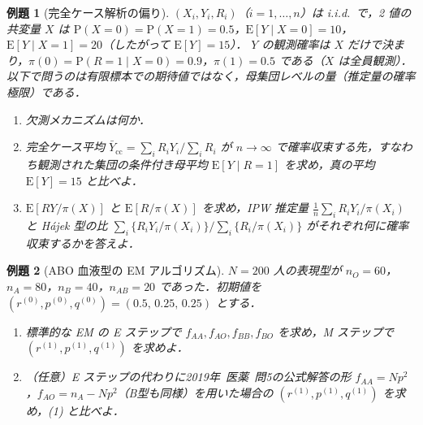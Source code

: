 \documentclass[a4paper,11pt,openany]{ltjsbook}
\newtheorem{reidai}{例題}[chapter]
\newcommand{\kakomon}[2]{\mbox{#1年 医薬 問#2}}
\newcommand{\E}{\mathrm{E}}
\newcommand{\Prob}{\mathrm{P}}
\begin{document}
\begin{reidai}[完全ケース解析の偏り]\label{reidai:16-2}
$(X_i,Y_i,R_i)$（$i=1,\dots,n$）は i.i.d.\ で，2 値の共変量 $X$ は $\Prob(X=0)=\Prob(X=1)=0.5$，$\E[Y\mid X=0]=10$，$\E[Y\mid X=1]=20$（したがって $\E[Y]=15$）．
$Y$ の観測確率は $X$ だけで決まり，$\pi(0)=\Prob(R=1\mid X=0)=0.9$，$\pi(1)=0.5$ である（$X$ は全員観測）．
以下で問うのは有限標本での期待値ではなく，母集団レベルの量（推定量の確率極限）である．
\begin{enumerate}[label=(\arabic*)]
\item 欠測メカニズムは何か．
\item 完全ケース平均 $\bar Y_{\mathrm{cc}}=\sum_iR_iY_i/\sum_iR_i$ が $n\to\infty$ で確率収束する先，すなわち観測された集団の条件付き母平均 $\E[Y\mid R=1]$ を求め，真の平均 $\E[Y]=15$ と比べよ．
\item $\E[RY/\pi(X)]$ と $\E[R/\pi(X)]$ を求め，IPW 推定量 $\frac1n\sum_iR_iY_i/\pi(X_i)$ と Hájek 型の比 $\sum_i\{R_iY_i/\pi(X_i)\}/\sum_i\{R_i/\pi(X_i)\}$ がそれぞれ何に確率収束するかを答えよ．
\end{enumerate}
\end{reidai}

\begin{reidai}[ABO 血液型の EM アルゴリズム]\label{reidai:16-3}
$N=200$ 人の表現型が $n_O=60$，$n_A=80$，$n_B=40$，$n_{AB}=20$ であった．初期値を $(r^{(0)},p^{(0)},q^{(0)})=(0.5,\,0.25,\,0.25)$ とする．
\begin{enumerate}[label=(\arabic*)]
\item 標準的な EM の E ステップで $f_{AA},f_{AO},f_{BB},f_{BO}$ を求め，M ステップで $(r^{(1)},p^{(1)},q^{(1)})$ を求めよ．
\item （任意）E ステップの代わりに\kakomon{2019}{5}の公式解答の形 $f_{AA}=Np^2$，$f_{AO}=n_A-Np^2$（B型も同様）を用いた場合の $(r^{(1)},p^{(1)},q^{(1)})$ を求め，(1) と比べよ．
\end{enumerate}
\end{reidai}
\end{document}
